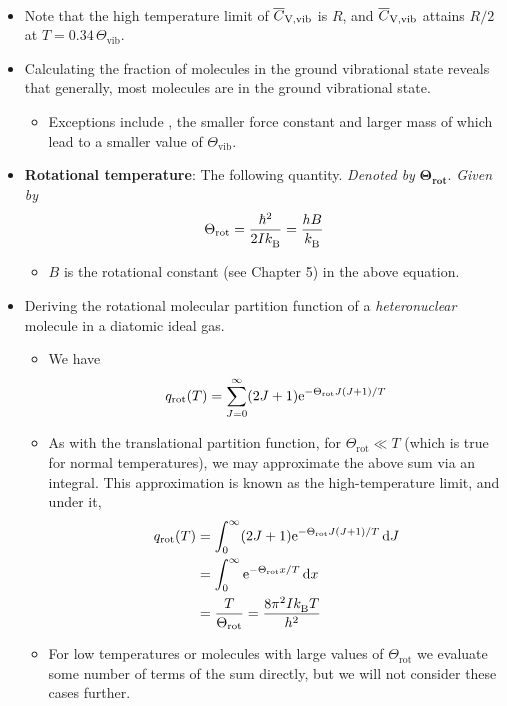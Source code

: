 \documentclass[../notes.tex]{subfiles}
\begin{document}
\begin{itemize}
\begin{gather*}
    \end{gather*}
    \item Note that the high temperature limit of $\overline{C}_\text{V,\text{vib}}$ is $R$, and $\overline{C}_\text{V,\text{vib}}$ attains $R/2$ at $T=0.34\,\Theta_\text{vib}$.
    \item Calculating the fraction of molecules in the ground vibrational state reveals that generally, most molecules are in the ground vibrational state.
    \begin{itemize}
        \item Exceptions include , the smaller force constant and larger mass of which lead to a smaller value of $\Theta_\text{vib}$.
    \end{itemize}
    \item \textbf{Rotational temperature}: The following quantity. \emph{Denoted by} $\bm{\Theta_\text{rot}}$. \emph{Given by}
    \begin{equation*}
        \Theta_\text{rot} = \frac{\hbar^2}{2I\kB} = \frac{hB}{\kB}
    \end{equation*}
    \begin{itemize}
        \item $B$ is the rotational constant (see Chapter 5) in the above equation.
    \end{itemize}
    \item Deriving the rotational molecular partition function of a \emph{heteronuclear} molecule in a diatomic ideal gas.
    \begin{itemize}
        \item We have
        \begin{equation*}
            q_\text{rot}(T) = \sum_{J=0}^\infty(2J+1)\e[-\Theta_\text{rot}J(J+1)/T]
        \end{equation*}
        \item As with the translational partition function, for $\Theta_\text{rot}\ll T$ (which is true for normal temperatures), we may approximate the above sum via an integral. This approximation is known as the high-temperature limit, and under it,
        \begin{align*}
            q_\text{rot}(T) &= \int_0^\infty(2J+1)\e[-\Theta_\text{rot}J(J+1)/T]\dd{J}\\
            &= \int_0^\infty\e[-\Theta_\text{rot}x/T]\dd{x}\\
            &= \frac{T}{\Theta_\text{rot}} = \frac{8\pi^2I\kB T}{h^2}
        \end{align*}
        \item For low temperatures or molecules with large values of $\Theta_\text{rot}$ we evaluate some number of terms of the sum directly, but we will not consider these cases further.

\end{itemize}
\end{itemize}
\end{document}
